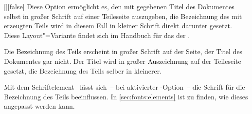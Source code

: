 \begin{Declaration}{[\PBoolean]}[false]%
\printdeclarationlist%
%
%
Diese Option ermöglicht es, den mit  gegebenen Titel des 
Dokumentes selbst in großer Schrift auf einer Teileseite auszugeben, die 
Bezeichnung des mit  erzeugten Teils wird 
in diesem Fall in kleiner Schrift direkt darunter gesetzt. Diese 
Layout"=Variante findet sich im Handbuch für das \CD der \TnUD. \notudscrartcl
%
\begin{values}
\itemfalse
  Die Bezeichnung des Teils erscheint in großer Schrift auf der Seite, der 
  Titel des Dokumentes gar nicht.
\itemtrue*
  Der Titel wird in großer Auszeichnung auf der Teileseite gesetzt, die 
  Bezeichnung des Teils selber in kleinerer.
\end{values}
\end{Declaration}

\begin{Declaration}[v2.02]{}
\printdeclarationlist%
%
Mit dem Schriftelement~ lässt sich~-- bei aktivierter 
-Option~-- die Schrift für die Bezeichnung des Teils 
beeinflussen. In \autoref{sec:fonts:elements} ist zu finden, wie dieses 
angepasst werden kann.
\end{Declaration}


